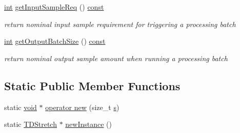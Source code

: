 \begin{DoxyCompactItemize}
\item 
\hyperlink{xmltok_8h_a5a0d4a5641ce434f1d23533f2b2e6653}{int} \hyperlink{classsoundtouch_1_1_t_d_stretch_a8b84e924abb5cf2b3bd4d6cef2edaca5}{get\+Input\+Sample\+Req} () \hyperlink{getopt1_8c_a2c212835823e3c54a8ab6d95c652660e}{const} 
\begin{DoxyCompactList}\small\item\em return nominal input sample requirement for triggering a processing batch \end{DoxyCompactList}\item 
\hyperlink{xmltok_8h_a5a0d4a5641ce434f1d23533f2b2e6653}{int} \hyperlink{classsoundtouch_1_1_t_d_stretch_a38b44f6b0e0dfe91a5eba5da6fc4f448}{get\+Output\+Batch\+Size} () \hyperlink{getopt1_8c_a2c212835823e3c54a8ab6d95c652660e}{const} 
\begin{DoxyCompactList}\small\item\em return nominal output sample amount when running a processing batch \end{DoxyCompactList}\end{DoxyCompactItemize}
\subsection*{Static Public Member Functions}
\begin{DoxyCompactItemize}
\item 
static \hyperlink{sound_8c_ae35f5844602719cf66324f4de2a658b3}{void} $\ast$ \hyperlink{classsoundtouch_1_1_t_d_stretch_ab708420e04e16718d68b30d2a5a5ca3b}{operator new} (size\+\_\+t \hyperlink{lib_2expat_8h_a755339d27872b13735c2cab829e47157}{s})
\item 
static \hyperlink{classsoundtouch_1_1_t_d_stretch}{T\+D\+Stretch} $\ast$ \hyperlink{classsoundtouch_1_1_t_d_stretch_a2cf85415e2c0fa63f9d90457c6a15106}{new\+Instance} ()
\end{DoxyCompactItemize}
